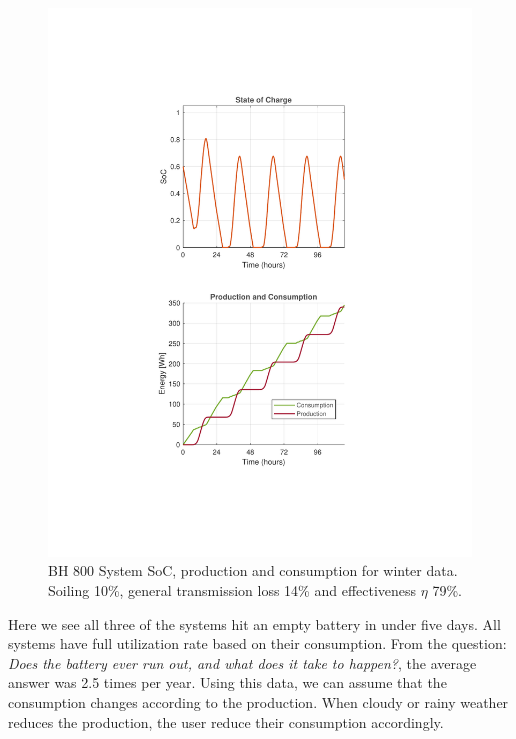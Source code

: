 \begin{minipage}[t]{0.32\textwidth} %
    \begin{figure}[H]
        \centering
        \includegraphics[width=\linewidth]{photos/Winter_SOC&Consumption_with_all_loss_5Days_800System.pdf} %
        \captionsetup{font=footnotesize} %
        \caption{BH 800 System SoC, production and consumption for winter data. Soiling 10\%, general transmission loss 14\% and effectiveness $\eta$ 79\%.}
        \label{result:fig:800_winter_soc}
    \end{figure}
\end{minipage}

Here we see all three of the systems hit an empty battery in under five days. All systems have full utilization rate based on their consumption. From the question: \textit{Does the battery ever run out, and what does it take to happen?}, the average answer was 2.5 times per year. Using this data, we can assume that the consumption changes according to the production. When cloudy or rainy weather reduces the production, the user reduce their consumption accordingly. 


